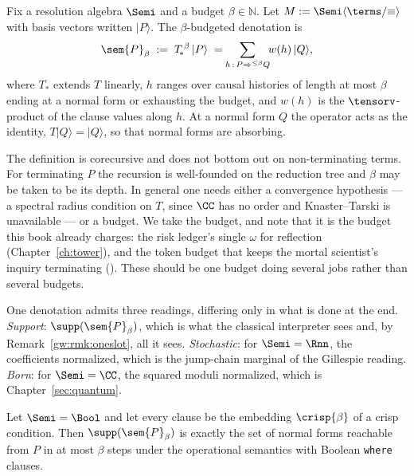 \begin{definition}
\label{gw:def:denotation}
Fix a resolution algebra $\Semi$ and a budget $\beta \in \mathbb{N}$. Let
$M := \Semi\langle \terms/{\equiv}\rangle$ with basis vectors written $\lvert P \rangle$.
The $\beta$-budgeted denotation is
\[
  \sem{P}_\beta \;:=\; T_{\!*}^{\,\beta}\,\lvert P \rangle
  \;=\;\!\!\sum_{h \,:\, P \Rightarrow^{\leq\beta} Q}\!\! w(h)\,\lvert Q\rangle ,
\]
where $T_*$ extends $T$ linearly, $h$ ranges over causal histories of length at most
$\beta$ ending at a normal form or exhausting the budget, and $w(h)$ is the
$\tensorv$-product of the clause values along $h$. At a normal form $Q$ the operator acts
as the identity, $T\lvert Q\rangle = \lvert Q\rangle$, so that normal forms are absorbing.
\end{definition}

\begin{remark}
\label{gw:rmk:budget}
The definition is corecursive and does not bottom out on non-terminating terms. For
terminating $P$ the recursion is well-founded on the reduction tree and $\beta$ may be
taken to be its depth. In general one needs either a convergence hypothesis --- a
spectral radius condition on $T$, since $\CC$ has no order and Knaster--Tarski is
unavailable --- or a budget. We take the budget, and note that it is the budget this book
already charges: the risk ledger's single $\omega$ for reflection
(Chapter~\ref{ch:tower}), and the token budget that keeps the mortal scientist's inquiry
terminating (\chSci). These should be one budget doing several jobs rather than several
budgets.
\end{remark}

One denotation admits three readings, differing only in what is done at the end.
\emph{Support}: $\supp(\sem{P}_\beta)$, which is what the classical interpreter sees and,
by Remark~\ref{gw:rmk:oneslot}, all it sees. \emph{Stochastic}: for $\Semi = \Rnn$, the
coefficients normalized, which is the jump-chain marginal of the Gillespie reading.
\emph{Born}: for $\Semi = \CC$, the squared moduli normalized, which is
Chapter~\ref{sec:quantum}.

\begin{theorem}[Conservativity]
\label{gw:thm:conservativity}
Let $\Semi = \Bool$ and let every clause be the embedding $\crisp{\beta}$ of a crisp
condition. Then $\supp(\sem{P}_\beta)$ is exactly the set of normal forms reachable from
$P$ in at most $\beta$ steps under the operational semantics with Boolean
\texttt{where} clauses.
\end{theorem}

